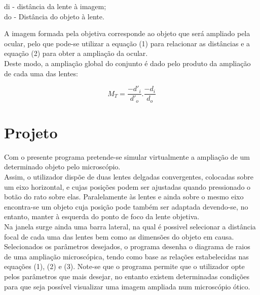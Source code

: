 \documentclass{article}
\begin{document}
\begin{multicols}{2}
\begin{flushright}
d{\tiny i} - distância da lente à imagem;\\
d{\tiny o } - Distância do objeto à lente.\\
\end{flushright}
 
A imagem formada pela objetiva corresponde ao objeto que será ampliado pela ocular, pelo que pode-se utilizar a equação (1) para relacionar as distâncias e a equação (2) para obter a ampliação da ocular.\\

Deste modo, a ampliação global do conjunto é dado pelo produto da ampliação de cada uma das lentes:


\begin{equation}
M_{T}=\frac{-d'_{i}}{d'_{o}}.\frac{-d_{i}}{d_{o}}
\end{equation}
 



\section*{Projeto}
\indent  Com o presente programa pretende-se simular virtualmente a ampliação de um determinado objeto pelo microscópio.\\ 

Assim, o utilizador dispõe de duas lentes delgadas convergentes, colocadas sobre um eixo horizontal, e cujas posições podem ser ajustadas quando pressionado o botão do rato sobre elas. Paralelamente às lentes e ainda sobre o mesmo eixo encontra-se um objeto cuja posição pode também ser adaptada devendo-se, no entanto, manter à esquerda do ponto de foco da lente objetiva.\\

Na janela surge ainda uma barra lateral, na qual é possivel selecionar a distância focal de cada uma das lentes bem como as dimensões do objeto em causa.\\

Selecionados os parâmetros desejados, o programa desenha o diagrama de raios de uma ampliação microscópica, tendo como base as relações estabelecidas nas equações (1), (2) e (3). Note-se que o programa permite que o utilizador opte pelos parâmetros que mais desejar, no entanto existem determinadas condições para que seja possível visualizar uma imagem ampliada num microscópio ótico.\\ \\


\end{multicols}
\end{document}
